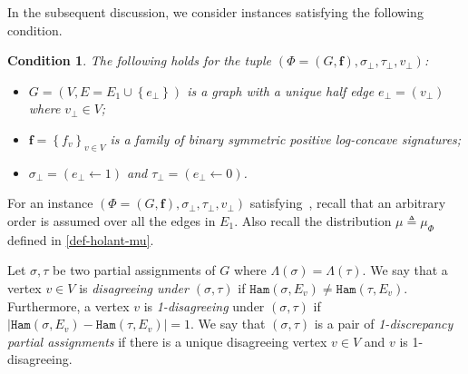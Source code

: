 \documentclass[11pt]{article}
\newtheorem{condition}{Condition}
\newcommand{\abs}[1]{\left\vert#1\right\vert}
\newcommand{\set}[1]{\left\{#1\right\}}
\def\!#1{\mathtt{#1}}
\newcommand{\vecf}{\boldsymbol{f}}
\newcommand{\zdtodo}[1]{\todo[color = blue!40, size = \tiny]{\textbf{zhidan:} #1}}
\newcommand{\qgl}[1]{{\color{purple}{#1}}}
\begin{document}
In the subsequent discussion, we consider instances satisfying the following condition.
\begin{condition}\label{cond-instancepair}
    The following holds for the tuple $\left(\Phi = (G, \vecf),  \sigma_\bot, \tau_\bot,v_{\bot}\right)$:
    \begin{itemize}
		\item $G = (V, E = E_1 \cup \set{e_\bot})$ is a graph with a unique half edge $e_\bot = (v_{\bot})$ where $v_\bot \in V$;
		\item $\vecf = \set{f_v}_{v \in V}$ is a family of binary symmetric positive log-concave signatures;
		\item $\sigma_\bot = (e_\bot \gets 1)$ and $\tau_\bot = (e_\bot \gets 0)$.
    \end{itemize}
\end{condition}

    
For an instance $(\Phi = (G, \vecf), \sigma_\bot, \tau_\bot, v_\bot)$ satisfying~, recall that an arbitrary order is assumed over all the edges in $E_1$.
Also recall the distribution $\mu \triangleq \mu_{\Phi}$ defined in \eqref{def-holant-mu}.
    
    Let $\sigma, \tau$ be two partial assignments of $G$ where $\Lambda(\sigma) = \Lambda(\tau)$.
    We say that a vertex $v \in V$ is \emph{disagreeing under $(\sigma, \tau)$} if ${\!{Ham}\left(\sigma,{E_v}\right)}\neq{\!{Ham}\left(\tau,{E_v}\right)}$. Furthermore, a vertex $v$ is \emph{1-disagreeing} under $(\sigma, \tau)$ if $\abs{{\!{Ham}\left(\sigma,{E_v}\right)}-{\!{Ham}\left(\tau,{E_v}\right)}}=1$.
    We say that $(\sigma, \tau)$ is a pair of \emph{1-discrepancy partial assignments} if there is a unique disagreeing vertex $v \in V$ and $v$ is 1-disagreeing.
\end{document}
